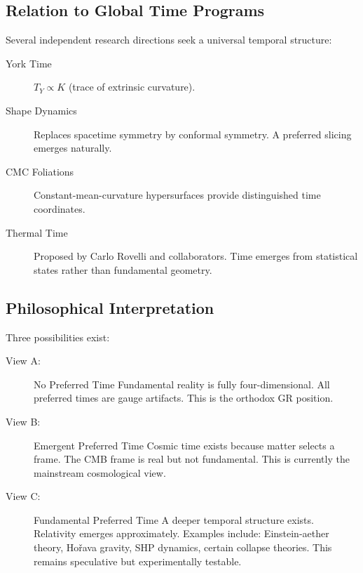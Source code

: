 \subsection{ Relation to Global Time Programs}
Several independent research directions seek a universal temporal structure:
\begin{description}
    \item [ York Time] $ T_Y \propto K $ (trace of extrinsic curvature).
    \item [ Shape Dynamics] Replaces spacetime symmetry by conformal symmetry. 
        A preferred slicing emerges naturally.
    \item [ CMC Foliations] Constant-mean-curvature hypersurfaces provide distinguished time coordinates.
    \item [ Thermal Time] Proposed by Carlo Rovelli and collaborators.
Time emerges from statistical states rather than fundamental geometry.
\end{description}
\subsection{ Philosophical Interpretation}
Three possibilities exist:
\begin{description}
    \item [ View A:]  No Preferred Time
Fundamental reality is fully four-dimensional.
All preferred times are gauge artifacts.
This is the orthodox GR position.
    \item [ View B:]  Emergent Preferred Time
Cosmic time exists because matter selects a frame.
The CMB frame is real but not fundamental.
This is currently the mainstream cosmological view.
    \item [ View C:]  Fundamental Preferred Time
A deeper temporal structure exists.
Relativity emerges approximately.
Examples include:
Einstein-aether theory,
Hořava gravity,
SHP dynamics,
certain collapse theories.
This remains speculative but experimentally testable.
\end{description}

